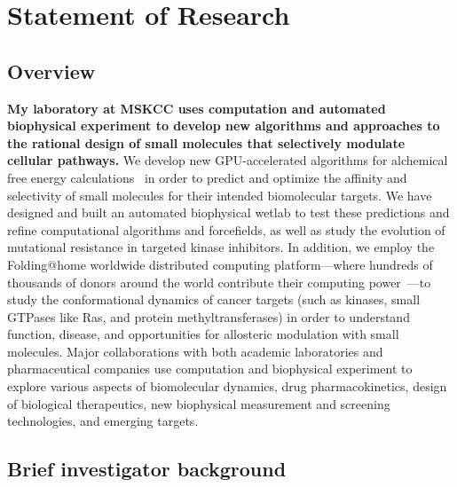 \documentclass[10pt]{article}
\renewcommand{\baselinestretch}{1.1}
\begin{document}
\setlength{\oddsidemargin}{0pt}
\setlength{\evensidemargin}{0pt}
\setlength{\marginparwidth}{0pt}
\setlength{\textwidth}{7.5in}
\setlength{\marginparsep}{0pt}
 \fancyfootoffset{-0.5in}

\renewcommand{\baselinestretch}{1.0}
\setlength{\parskip}{0.25em}

\section*{Statement of Research}

\subsection*{Overview}

{\bf My laboratory at MSKCC uses computation and automated biophysical experiment to develop new algorithms and approaches to the rational design of small molecules that selectively modulate cellular pathways.}
We develop new GPU-accelerated algorithms for alchemical free energy calculations~\cite{tembe-mccammon:comput-chem:1984:alchemical-free-energy-calculations,shirts-mobley-chodera:2007:annu-rep-comput-chem:prime-time,chodera:curr-opin-struct-biol:2011:drug-discovery,wang:jcamd:2013:yank} in order to predict and optimize the affinity and selectivity of small molecules for their intended biomolecular targets.
We have designed and built an automated biophysical wetlab to test these predictions and refine computational algorithms and forcefields, as well as study the evolution of mutational resistance in targeted kinase inhibitors.
In addition, we employ the Folding@home worldwide distributed computing platform---where hundreds of thousands of donors around the world contribute their computing power~\cite{shirts-pande:science:2000:folding-at-home,folding-at-home-stats}---to study the conformational dynamics of cancer targets (such as kinases, small GTPases like Ras, and protein methyltransferases) in order to understand function, disease, and opportunities for allosteric modulation with small molecules.
Major collaborations with both academic laboratories and pharmaceutical companies use computation and biophysical experiment to explore various aspects of biomolecular dynamics, drug pharmacokinetics, design of biological therapeutics, new biophysical measurement and screening technologies, and emerging targets.

\subsection*{Brief investigator background}
\end{document}
